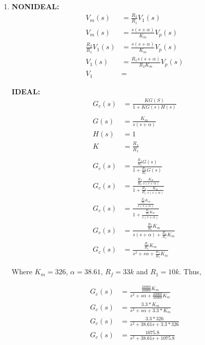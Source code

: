 \documentclass[11pt,a4paper]{article}
\begin{document}
\begin{enumerate}
    
    
    \pagebreak
	\item 
    \textbf{NONIDEAL:}\\
    \begin{align*}
	V_{m}(s) &= \frac{R_2}{R_1} V_{1}(s) \\
    V_{m}(s) &= \frac{s(s+\alpha)}{K_m} V_{p}(s) \\
    \frac{R_2}{R_1} V_{1}(s) &= \frac{s(s+\alpha)}{K_m} V_{p}(s) \\
    V_{1}(s) &= \frac{R_1 s(s+\alpha)}{R_2 K_m} V_{p}(s) \\
    V_{1} &= 
	\end{align*}
    
    
    
    
    
    \pagebreak
    \textbf{IDEAL:}\\
    \begin{align*}
    G_c(s) &= \frac{K G(S)}{1 + K G(s) H(s)} \\\\
    G(s) &= \frac{K_m}{s(s+\alpha)} \\
    H(s) &= 1 \\
    K &= \frac{R_f}{R_1} \\\\
    G_c(s) &= \frac{\frac{R_f}{R_1} G(s)} {1 + \frac{R_f}{R_1} G(s)} \\
    G_c(s) &= \frac{\frac{R_f}{R_1} \frac{K_m}{s(s+\alpha)}} {1 + \frac{R_f}{R_1} \frac{K_m}{s(s+\alpha)}} \\
    G_c(s) &= \frac{\frac{\frac{R_f}{R_1}K_m}{s(s+\alpha)}} {1 + \frac{\frac{R_f}{R_1}K_m}{s(s+\alpha)}} \\
    G_c(s) &= \frac{\frac{R_f}{R_1}K_m} {s(s+\alpha) + \frac{R_f}{R_1}K_m} \\
    G_c(s) &= \frac{\frac{R_f}{R_1}K_m} {s^2 + s\alpha + \frac{R_f}{R_1}K_m}
	\end{align*}
    
    Where $K_m = 326$, $\alpha = 38.61$, $R_f = 33k$ and $R_1 = 10k$.
    Thus,
    
    \begin{align*}
	G_c(s) &= \frac{\frac{33000}{10000}K_m} {s^2 + s\alpha + \frac{33000}{10000}K_m} \\
    G_c(s) &= \frac{3.3*K_m} {s^2 + s\alpha + 3.3*K_m} \\
    G_c(s) &= \frac{3.3*326} {s^2 + 38.61s + 3.3*326} \\
    G_c(s) &= \frac{1075.8} {s^2 + 38.61s + 1075.8} \\
	\end{align*}
    

\end{enumerate}
\end{document}
